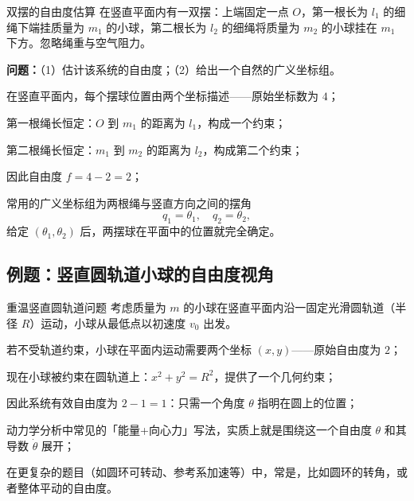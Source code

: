 \documentclass[a4paper,11pt]{ctexart}
\begin{document}
\begin{examplebox}{双摆的自由度估算}
  在竖直平面内有一双摆：上端固定一点 $O$，第一根长为 $l_1$ 的细绳下端挂质量为 $m_1$ 的小球，第二根长为 $l_2$ 的细绳将质量为 $m_2$ 的小球挂在 $m_1$ 下方。忽略绳重与空气阻力。

  \textbf{问题：}（1）估计该系统的自由度；（2）给出一个自然的广义坐标组。

  \begin{focuspoints}
    \item 在竖直平面内，每个摆球位置由两个坐标描述——原始坐标数为 $4$；
    \item 第一根绳长恒定：$O$ 到 $m_1$ 的距离为 $l_1$，构成一个约束；
    \item 第二根绳长恒定：$m_1$ 到 $m_2$ 的距离为 $l_2$，构成第二个约束；
    \item 因此自由度 $f = 4 - 2 = 2$；
    \item 常用的广义坐标组为两根绳与竖直方向之间的摆角
          \[
            q_1 = \theta_1,\quad q_2 = \theta_2,
          \]
          给定 $(\theta_1,\theta_2)$ 后，两摆球在平面中的位置就完全确定。
  \end{focuspoints}
\end{examplebox}

\subsection{例题：竖直圆轨道小球的自由度视角}

\begin{examplebox}{重温竖直圆轨道问题}
  考虑质量为 $m$ 的小球在竖直平面内沿一固定光滑圆轨道（半径 $R$）运动，小球从最低点以初速度 $v_0$ 出发。

  \begin{focuspoints}
    \item 若不受轨道约束，小球在平面内运动需要两个坐标 $(x,y)$——原始自由度为 $2$；
    \item 现在小球被约束在圆轨道上：$x^2 + y^2 = R^2$，提供了一个几何约束；
    \item 因此系统有效自由度为 $2-1=1$：只需一个角度 $\theta$ 指明在圆上的位置；
    \item 动力学分析中常见的「能量+向心力」写法，实质上就是围绕这一个自由度 $\theta$ 和其导数 $ \dot\theta $ 展开；
    \item 在更复杂的题目（如圆环可转动、参考系加速等）中，常是，比如圆环的转角，或者整体平动的自由度。
  \end{focuspoints}
\end{examplebox}
\end{document}
